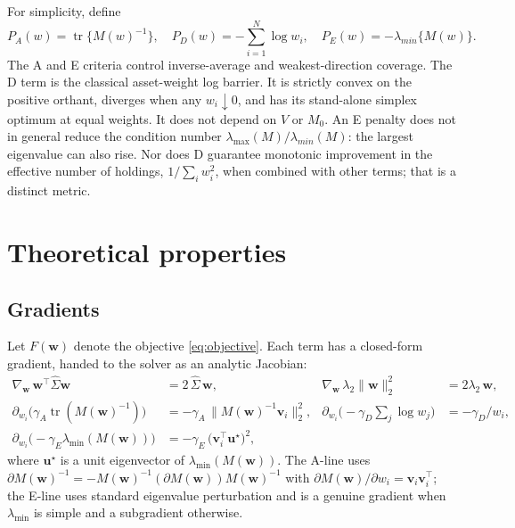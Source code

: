 \documentclass[11pt]{article}
\newcommand{\Sighat}{\hat\Sigma}
\newcommand{\tr}{\operatorname{tr}}
\newcommand{\w}{\mathbf{w}}
\newcommand{\vv}{\mathbf{v}}
\newcommand{\uu}{\mathbf{u}}
\newcommand{\M}{M(\w)}
\newcommand{\lammin}{\lambda_{\min}}
\begin{document}
For simplicity, define 
\begin{equation}\label{eq:criteria}
 P_A(w)=\tr\{M(w)^{-1}\},\quad P_D(w)=-\sum_{i=1}^N\log w_i,\quad P_E(w)=-\lambda_{min}\{M(w)\}.
\end{equation}
The A and E criteria control inverse-average and weakest-direction coverage. The D term is the classical asset-weight log barrier. It is strictly convex on the positive orthant, diverges when any $w_i\downarrow0$, and has its stand-alone simplex optimum at equal weights. It does not depend on $V$ or $M_0$. An E penalty does not in general reduce the condition number $\lambda_{\max}(M)/\lambda_{min}(M)$: the largest eigenvalue can also rise. Nor does D guarantee monotonic improvement in the effective number of holdings, $1/\sum_iw_i^2$, when combined with other terms; that is a distinct metric.


\section{Theoretical properties}
\subsection{Gradients}
Let $F(\w)$ denote the objective \eqref{eq:objective}. Each term has a closed-form
gradient, handed to the solver as an analytic Jacobian:
\begin{align*}
  \nabla_{\w}\,\w^\top\Sighat\w &= 2\,\Sighat\,\w, &
  \nabla_{\w}\,\lambda_2\lVert\w\rVert_2^2 &= 2\lambda_2\,\w,\\
  \partial_{w_i}\big(\gamma_A\tr(\M^{-1})\big)
    &= -\gamma_A\,\lVert\M^{-1}\vv_i\rVert_2^2, &
  \partial_{w_i}\big({-}\gamma_D\textstyle\sum_j\log w_j\big) &= -\gamma_D/w_i,\\
  \partial_{w_i}\big({-}\gamma_E\lammin(\M)\big)
    &= -\gamma_E\,\big(\vv_i^\top\uu^\star\big)^2, &&
\end{align*}
where $\uu^\star$ is a unit eigenvector of $\lammin(\M)$. The A-line uses
$\partial\M^{-1}=-\M^{-1}(\partial\M)\M^{-1}$ with $\partial\M/\partial w_i=\vv_i\vv_i^\top$;
the E-line uses standard eigenvalue perturbation and is a genuine gradient when
$\lammin$ is simple and a subgradient otherwise.
\end{document}
